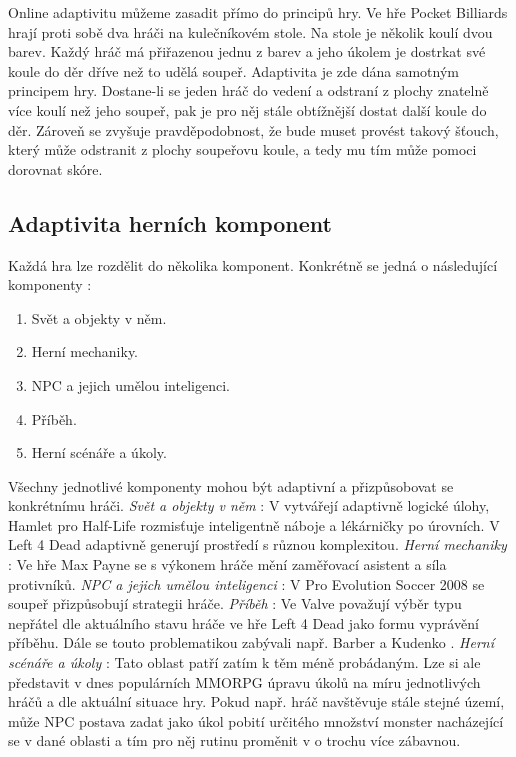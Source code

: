 Online adaptivitu můžeme zasadit přímo do principů hry. Ve hře Pocket Billiards hrají proti sobě dva hráči na kulečníkovém stole. Na stole je několik koulí dvou barev. Každý hráč má přiřazenou jednu z barev a jeho úkolem je dostrkat své koule do děr dříve než to udělá soupeř. Adaptivita je zde dána samotným principem hry. Dostane-li se jeden hráč do vedení a odstraní z plochy znatelně více koulí než jeho soupeř, pak je pro něj stále obtížnější dostat další koule do děr. Zároveň se zvyšuje pravděpodobnost, že bude muset provést takový šťouch, který může odstranit z plochy soupeřovu koule, a tedy mu tím může pomoci dorovnat skóre.\cite{5}

\subsection{Adaptivita herních komponent}

Každá hra lze rozdělit do několika komponent. Konkrétně se jedná o následující komponenty \cite{16Survey} : 

\begin{enumerate}
	\item Svět a objekty v něm.
	\item Herní mechaniky.
	\item NPC a jejich umělou inteligenci.
	\item Příběh.
	\item Herní scénáře a úkoly.
\end{enumerate}

Všechny jednotlivé komponenty mohou být adaptivní a přizpůsobovat se konkrétnímu hráči. \textit{Svět a objekty v něm} : V \cite{17Evol} vytvářejí adaptivně logické úlohy, Hamlet \cite{20Hun} pro Half-Life rozmisťuje inteligentně náboje a lékárničky po úrovních. V Left 4 Dead adaptivně generují prostředí s různou komplexitou. \textit{Herní mechaniky} : Ve hře Max Payne se s výkonem hráče mění zaměřovací asistent a síla protivníků. \cite{RiskTakers} \textit{NPC a jejich umělou inteligenci} : V Pro Evolution Soccer 2008 se soupeř přizpůsobují strategii hráče. \cite{6} \textit{Příběh} : Ve Valve považují výběr typu nepřátel dle aktuálního stavu hráče ve hře Left 4 Dead jako formu vyprávění příběhu. \cite{2} Dále se touto problematikou zabývali např. Barber a Kudenko \cite{Narratives}. \textit{Herní scénáře a úkoly} : Tato oblast patří zatím k těm méně probádaným. Lze si ale představit v dnes populárních MMORPG úpravu úkolů na míru jednotlivých hráčů a dle aktuální situace hry. Pokud např. hráč navštěvuje stále stejné území, může NPC postava zadat jako úkol pobití určitého množství monster nacházející se v dané oblasti a tím pro něj rutinu proměnit v o trochu více zábavnou.



